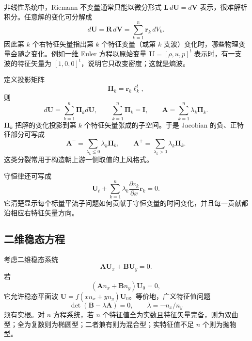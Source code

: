 \documentclass[11pt,a4paper,openany,fontset=none]{ctexbook}
\begin{document}
非线性系统中，Riemann 不变量通常只能以微分形式 $\bm L\,d\bm U=d\bm V$ 表示，很难解析积分。任意解的变化可分解成
\begin{equation}
 d\bm U=\bm R\,d\bm V=\sum_{k=1}^n\bm r_k\,dV_k. \tag{1.16.13}
\end{equation}
因此第 $k$ 个右特征矢量指出第 $k$ 个特征变量（或第 $k$ 支波）变化时，哪些物理变量会随之变化。例如一维 Euler 方程以原始变量 $\bm U=[\rho,u,p]^t$ 表示时，有一支波的特征矢量为 $[1,0,0]^t$，说明它只改变密度；这就是熵波。

定义投影矩阵
\begin{equation}
 \bm\Pi_k=\bm r_k\bm\ell_k^t, \tag{1.16.16}
\end{equation}
则
\begin{equation}
 d\bm U=\sum_{k=1}^n\bm\Pi_kd\bm U,\qquad
 \sum_{k=1}^n\bm\Pi_k=\bm I,\qquad
 \bm A=\sum_{k=1}^n\lambda_k\bm\Pi_k. \tag{1.16.15--18}
\end{equation}
$\bm\Pi_k$ 把解的变化投影到第 $k$ 个特征矢量张成的子空间。于是 Jacobian 的负、正特征部分可写成
\begin{equation}
 \bm A^- =\sum_{\lambda_k\le0}\lambda_k\bm\Pi_k,\qquad
 \bm A^+ =\sum_{\lambda_k>0}\lambda_k\bm\Pi_k. \tag{1.16.19}
\end{equation}
这类分裂常用于构造朝上游一侧取值的上风格式。

守恒律还可写成
\begin{equation}
 \bm U_t+\sum_{k=1}^n\lambda_k\frac{\partial v_k}{\partial x}\bm r_k=0. \tag{1.16.22}
\end{equation}
它清楚显示每个标量平流子问题如何贡献于守恒变量的时间变化，并且每一贡献都沿相应右特征矢量方向。

\subsection{二维稳态方程}

考虑二维稳态系统
\begin{equation}
 \bm A\bm U_x+\bm B\bm U_y=0. \tag{1.16.23}
\end{equation}
若
\begin{equation}
 (\bm A n_x+\bm B n_y)\bm U_0=0, \tag{1.16.25}
\end{equation}
它允许稳态平面波 $\bm U=f(xn_x+yn_y)\bm U_0$。等价地，广义特征值问题
\begin{equation}
 \det(\bm B-\lambda\bm A)=0,\qquad \lambda=-n_x/n_y \tag{1.16.26}
\end{equation}
须有实根。对 $n$ 方程系统，若 $n$ 个特征值全为实数且特征矢量完备，则为双曲型；全为复数则为椭圆型；二者兼有则为混合型；实特征值不足 $n$ 个则为抛物型。
\end{document}
